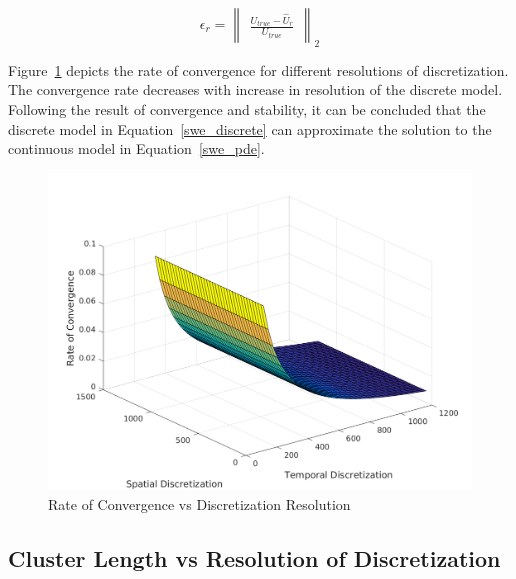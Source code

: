 \begin{equation}
\displaystyle \epsilon_r = \begin{Vmatrix}
\frac{U_{true} - \hat{U}_r}{U_{true}}
\end{Vmatrix}_2
\end{equation}

Figure~\ref{conv_plot} depicts the rate of convergence for different resolutions of discretization. The convergence rate decreases with increase in resolution of the discrete model.  Following the result of convergence and stability, it can be concluded that the discrete model in Equation~\ref{swe_discrete} can approximate the solution to the continuous model in Equation~\ref{swe_pde}.   

\begin{figure}[H]
\centering
\includegraphics[width=\textwidth]{figures_2/conv_disc}
\caption{Rate of Convergence vs Discretization Resolution}
\label{conv_plot}
\end{figure}



\subsection{Cluster Length vs Resolution of Discretization}


